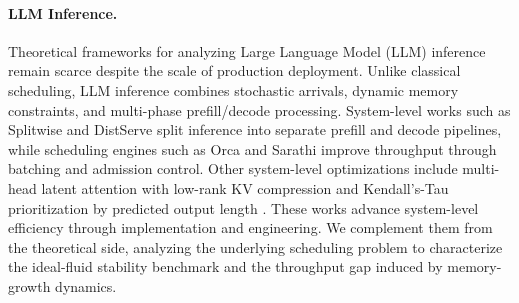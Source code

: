 \paragraph*{LLM Inference.} 
Theoretical frameworks for analyzing Large Language Model (LLM) inference remain scarce despite the scale of production deployment. Unlike classical scheduling, LLM inference combines stochastic arrivals, dynamic memory constraints, and multi-phase prefill/decode processing. System-level works such as Splitwise \citep{patel2023peeling} and DistServe \citep{zhong2024distserve} split inference into separate prefill and decode pipelines, while scheduling engines such as Orca \citep{yu2022orca} and Sarathi \citep{agrawal2023sarathi,agrawal2024taming} improve throughput through batching and admission control. Other system-level optimizations include multi-head latent attention with low-rank KV compression \citep{deepseekai2024deepseekv2strongeconomicalefficient} and Kendall's-Tau prioritization by predicted output length \citep{fu2025efficient}. These works advance system-level efficiency through implementation and engineering. We complement them from the theoretical side, analyzing the underlying scheduling problem to characterize the ideal-fluid stability benchmark and the throughput gap induced by memory-growth dynamics.
